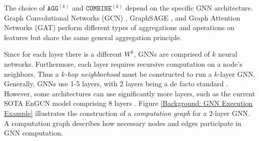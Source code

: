 The choice of $\mathtt{AGG}^{(k)}$ and $\mathtt{COMBINE}^{(k)}$ depend on the specific GNN architecture. Graph Convolutional Networks (GCN) \cite{GCN_2016}, GraphSAGE \cite{GraphSAGE_2017}, and Graph Attention Networks (GAT) \cite{GAT_2018} perform different types of aggregations and operations on features but share the same general aggregation principle.

Since for each layer there is a different $W^k$, GNNs are comprised of $k$ neural networks. Furthermore, each layer requires recursive computation on a node's neighbors. Thus a \textit{$k$-hop neighborhood} must be constructed to run a $k$-layer GNN.
Generally, GNNs use 1-5 layers, with 2 layers being a de facto standard \cite{Survey_First_2022}. However, some architectures can use significantly more layers, such as the current SOTA EnGCN model comprising 8 layers \cite{EnGCN_2023}.
Figure \ref{Background: GNN Execution Example} illustrates the construction of a \textit{computation graph} for a $2$-layer GNN. A computation graph describes how necessary nodes and edges participate in GNN computation.


